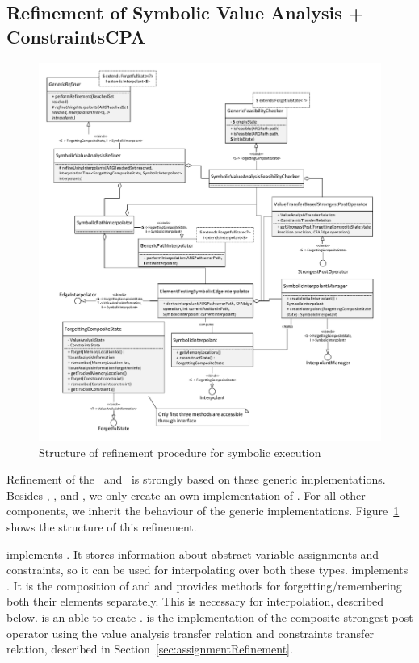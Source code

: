 \subsection{Refinement of Symbolic Value Analysis + ConstraintsCPA}

\begin{figure}[h!]
\includegraphics[width=1.2\linewidth]{implementationCegar/RefinementSymEx}
\caption{Structure of refinement procedure for symbolic execution}
\label{fig:refSymbolic}
\end{figure}
Refinement of the \symbolicValueAnalysisCPA\ and \constraintsCPA\ is strongly based on these generic implementations.
Besides , ,  and , we only
create an own implementation of .
For all other components, we inherit the behaviour of the generic implementations.
Figure~\ref{fig:refSymbolic} shows the structure of this refinement.

 implements .
It stores information about abstract variable assignments and constraints, so it can be used for interpolating over both these types.
 implements .
It is the composition of  and  and provides methods for forgetting/remembering both their elements separately.
This is necessary for interpolation, described below.
 is an  able to create .
 is the implementation of the composite strongest-post operator using the value analysis transfer relation and constraints transfer relation,
described in Section~\ref{sec:assignmentRefinement}.


